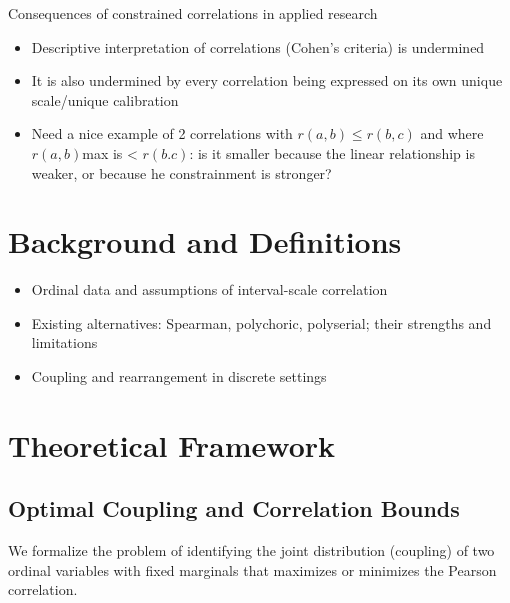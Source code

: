 \documentclass[
  12pt,
]{article}
\providecommand{\tightlist}{%
  \setlength{\itemsep}{0pt}\setlength{\parskip}{0pt}}\usepackage{longtable,booktabs,array}
\begin{document}
Consequences of constrained correlations in applied research

\begin{itemize}
\tightlist
\item
  Descriptive interpretation of correlations (Cohen's criteria) is
  undermined
\item
  It is also undermined by every correlation being expressed on its own
  unique scale/unique calibration
\item
  Need a nice example of 2 correlations with \(r(a,b) \le r(b,c)\) and
  where \(r(a,b)\)max is \textless{} \(r(b.c)\): is it smaller because
  the linear relationship is weaker, or because he constrainment is
  stronger?
\end{itemize}

\section{Background and Definitions}\label{background-and-definitions}

\begin{itemize}
\tightlist
\item
  Ordinal data and assumptions of interval-scale correlation\\
\item
  Existing alternatives: Spearman, polychoric, polyserial; their
  strengths and limitations\\
\item
  Coupling and rearrangement in discrete settings
\end{itemize}

\section{Theoretical Framework}\label{theoretical-framework}

\subsection{Optimal Coupling and Correlation
Bounds}\label{optimal-coupling-and-correlation-bounds}

We formalize the problem of identifying the joint distribution
(coupling) of two ordinal variables with fixed marginals that maximizes
or minimizes the Pearson correlation.
\end{document}
